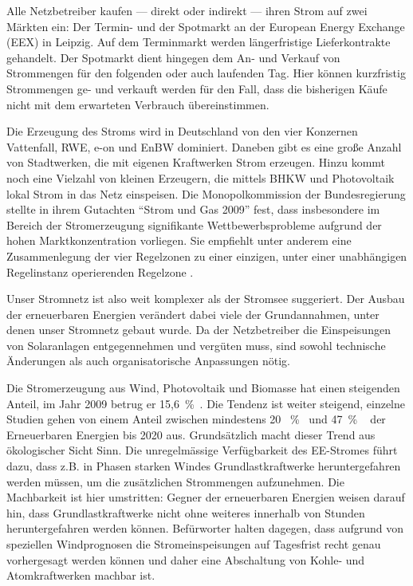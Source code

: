 \documentclass[12pt,BCOR=8.5mm]{scrartcl}
\begin{document}
\begin{enumerate}
    Alle Netzbetreiber kaufen --- direkt oder indirekt --- ihren Strom
    auf zwei Märkten ein: Der Termin- und der Spotmarkt an der European
    Energy Exchange (EEX) in Leipzig. Auf dem Terminmarkt werden
    längerfristige Lieferkontrakte gehandelt. Der Spotmarkt dient
    hingegen dem An- und Verkauf von Strommengen für den folgenden oder
    auch laufenden Tag. Hier können kurzfristig Strommengen ge- und
    verkauft werden für den Fall, dass die bisherigen Käufe nicht mit
    dem erwarteten Verbrauch übereinstimmen.

    Die Erzeugung des Stroms wird in Deutschland von den vier Konzernen
    Vattenfall, RWE, e-on und EnBW dominiert. Daneben gibt es eine
    große Anzahl von Stadtwerken, die mit eigenen Kraftwerken Strom
    erzeugen. Hinzu kommt noch eine Vielzahl von kleinen Erzeugern, die
    mittels BHKW und Photovoltaik lokal Strom in das Netz einspeisen.
    Die Monopolkommission der Bundesregierung stellte in ihrem Gutachten
    "`Strom und Gas 2009"' fest, dass insbesondere im Bereich der
    Stromerzeugung signifikante Wettbewerbsprobleme aufgrund der hohen
    Marktkonzentration vorliegen. Sie empfiehlt unter anderem eine
    Zusammenlegung der vier Regelzonen zu einer einzigen, unter einer
    unabhängigen Regelinstanz operierenden Regelzone
    \cite{monopolkommission09stromgas}. 
\end{enumerate}

Unser Stromnetz ist also weit komplexer als der Stromsee suggeriert.  Der
Ausbau der erneuerbaren Energien verändert dabei viele der
Grundannahmen, unter denen unser Stromnetz gebaut wurde. Da der
Netzbetreiber die Einspeisungen von Solaranlagen entgegennehmen und
vergüten muss, sind sowohl technische Änderungen als auch
organisatorische Anpassungen nötig.

Die Stromerzeugung aus Wind, Photovoltaik und Biomasse hat einen
steigenden Anteil, im Jahr 2009 betrug er
15,6~\%~\cite{web:bmwi-energiedaten}.  Die Tendenz ist weiter steigend,
einzelne Studien gehen von einem Anteil zwischen mindestens 20
~\%~\cite{dena05netzstudie1} und 47~\% ~\cite{iwes09simulation} der
Erneuerbaren Energien bis 2020 aus.  Grundsätzlich macht dieser Trend
aus ökologischer Sicht Sinn.  Die unregelmässige Verfügbarkeit des
EE-Stromes führt dazu, dass z.B. in Phasen starken Windes
Grundlastkraftwerke heruntergefahren werden müssen, um die zusätzlichen
Strommengen aufzunehmen. Die Machbarkeit ist hier umstritten:
Gegner der erneuerbaren Energien weisen darauf hin, dass
Grundlastkraftwerke nicht ohne weiteres innerhalb von Stunden
heruntergefahren werden können.  Befürworter halten dagegen, dass
aufgrund von speziellen Windprognosen die Stromeinspeisungen auf
Tagesfrist recht genau vorhergesagt werden können und daher eine
Abschaltung von Kohle- und Atomkraftwerken machbar ist.
\end{document}
